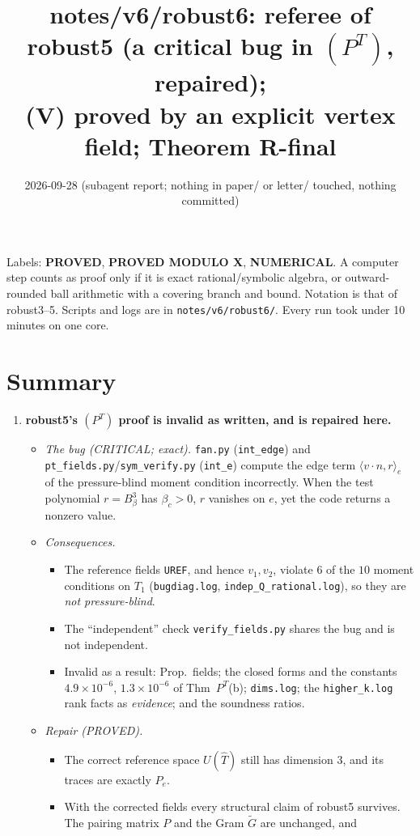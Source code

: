 \documentclass[11pt]{article}
\title{notes/v6/robust6: referee of robust5 (a critical bug in $(P^T)$, repaired);\\
(V) proved by an explicit vertex field; Theorem R-final}
\date{2026-09-28 (subagent report; nothing in paper/ or letter/ touched, nothing committed)}
\theoremstyle{remark}
\newcommand{\ip}[2]{\langle #1,#2\rangle}
\begin{document}
\maketitle

\noindent Labels: \textbf{PROVED}, \textbf{PROVED MODULO X}, \textbf{NUMERICAL}. A computer step counts as proof only
if it is exact rational/symbolic algebra, or outward-rounded ball arithmetic with a covering branch and bound.
Notation is that of robust3--5. Scripts and logs are in \texttt{notes/v6/robust6/}. Every run took under 10 minutes on one core.

\section*{Summary}
\begin{enumerate}
\item \textbf{robust5's $(P^T)$ proof is invalid as written, and is repaired here.}
 \begin{itemize}
 \item \emph{The bug (CRITICAL; exact).} \texttt{fan.py} (\texttt{int\_edge}) and \texttt{pt\_fields.py}/\texttt{sym\_verify.py}
 (\texttt{int\_e}) compute the edge term $\ip{v\cdot n}{r}_e$ of the pressure-blind moment condition incorrectly. When the test
 polynomial $r=B^3_\beta$ has $\beta_c>0$, $r$ vanishes on $e$, yet the code returns a nonzero value.
 \item \emph{Consequences.}
 \begin{itemize}
 \item The reference fields \texttt{UREF}, and hence $v_1,v_2$, violate $6$ of the $10$ moment conditions on $T_1$
 (\texttt{bugdiag.log}, \texttt{indep\_Q\_rational.log}), so they are \emph{not pressure-blind}.
 \item The ``independent'' check \texttt{verify\_fields.py} shares the bug and is not independent.
 \item Invalid as a result: Prop.~fields; the closed forms and the constants $4.9\times10^{-6}$, $1.3\times10^{-6}$ of Thm~$P^T$(b);
 \texttt{dims.log}; the \texttt{higher\_k.log} rank facts as \emph{evidence}; and the soundness ratios.
 \end{itemize}
 \item \emph{Repair (PROVED).}
 \begin{itemize}
 \item The correct reference space $U(\hat T)$ still has dimension $3$, and its traces are exactly $P_e$.
 \item With the corrected fields every structural claim of robust5 survives. The pairing matrix $P$ and the Gram $\tilde G$ are unchanged, and

\end{itemize}
\end{itemize}
\end{enumerate}
\end{document}
